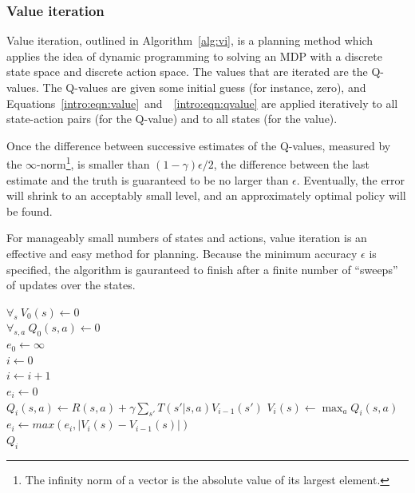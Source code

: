 \subsubsection{Value iteration}

Value iteration, outlined in Algorithm~\ref{alg:vi}, is a planning method which applies the idea of dynamic programming to solving an MDP with a discrete state space and discrete action space. The values that are iterated are the Q-values. The Q-values are given some initial guess (for instance, zero), and Equations~\ref{intro:eqn:value}~and~~\ref{intro:eqn:qvalue} are applied iteratively to all state-action pairs (for the Q-value) and to all states (for the value).

Once the difference between successive estimates of the Q-values, measured by the $\infty$-norm\footnote{The infinity norm of a vector is the absolute value of its largest element.}, is smaller than $(1-\gamma)\epsilon/2$, the difference between the last estimate and the truth is guaranteed to be no larger than $\epsilon$. Eventually, the error will shrink to an acceptably small level, and an approximately optimal policy will be found.

For manageably small numbers of states and actions, value iteration is an effective and easy method for planning. Because the minimum accuracy $\epsilon$ is specified, the algorithm is gauranteed to finish after a finite number of ``sweeps'' of updates over the states.

\begin{algorithm}[tb]
	\caption{$\mbox{Value iteration}(S, A, R, T, \gamma, \epsilon)$}
	\label{alg:vi}
	$\forall_s\ V_0(s)\leftarrow 0$\\
	$\forall_{s,a}\ Q_0(s,a)\leftarrow 0$\\
	$e_0 \leftarrow \infty$\\
	$i \leftarrow 0$\\
	 {
		$i \leftarrow i+1$\\
		$e_i \leftarrow 0$\\
		 {
			 {
				$Q_i(s,a) \leftarrow R(s,a) + \gamma \sum_{s'} T(s'|s,a) V_{i-1}(s')$
			}
			$V_i(s) \leftarrow \max_a Q_i(s,a)$\\
			$e_i \leftarrow max(e_i, |V_i(s)-V_{i-1}(s)|)$\\
		}
	}
	\Return $Q_i$
\end{algorithm}

